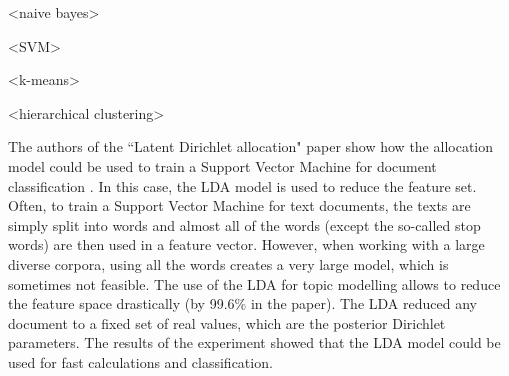 <naive bayes>

<SVM>

<k-means>

<hierarchical clustering>


The authors of the ``Latent Dirichlet allocation" paper show how the allocation model could be used to train a Support Vector Machine for document classification \cite{blei2003latent}. In this case, the LDA model is used to reduce the feature set. Often, to train a Support Vector Machine for text documents, the texts are simply split into words and almost all of the words (except the so-called stop words) are then used in a feature vector. However, when working with a large diverse corpora, using all the words creates a very large model, which is sometimes not feasible. The use of the LDA for topic modelling allows to reduce the feature space drastically (by 99.6\% in the paper). The LDA reduced any document to a fixed set of real values, which are the posterior Dirichlet parameters. The results of the experiment showed that the LDA model could be used for fast calculations and classification. 

 
 